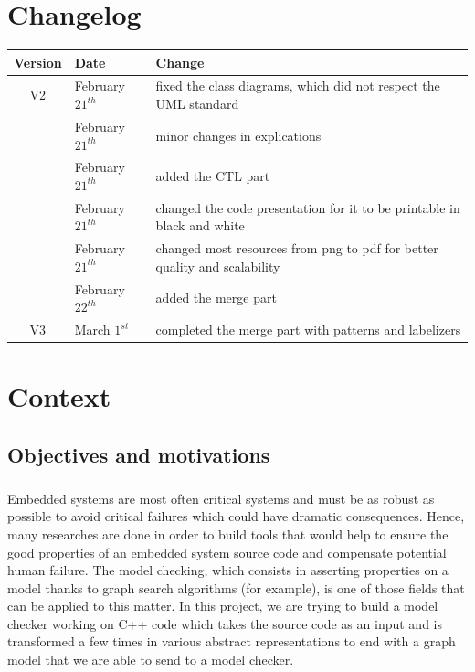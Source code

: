 \documentclass{report}
\begin{document}
\chapter*{Changelog}
\begin{center}
\begin{tabular}{|c|l|l|}
  \hline
  Version & Date & Change  \\
  \hline
  V2 & February $21^{th}$  & fixed the class diagrams, which did not respect the UML standard \\
  & February $21^{th}$ & minor changes in explications \\
  & February $21^{th}$ & added the CTL part \\
  & February $21^{th}$ & changed the code presentation for it to be printable in black and white \\
  & February $21^{th}$ & changed most resources from png to pdf for better quality and scalability \\
  & February $22^{th}$ & added the merge part \\
  \hline
  V3 & March $1^{st}$ & completed the merge part with patterns and labelizers \\
 \hline
\end{tabular}
\end{center}
\chapter{Context}

\section{Objectives and motivations}

\paragraph{}
\hspace{4mm}Embedded systems are most often critical systems and must be as robust as possible to avoid critical failures which could have dramatic consequences.
Hence, many researches are done in order to build tools that would help to ensure the good properties of an embedded system source code and compensate potential human
failure. The model checking, which consists in asserting properties on a model thanks to graph search algorithms (for example), is one of those fields that can be
applied to this matter. In this project, we are trying to build a model checker working on C++ code which takes the source code as an input and is transformed a few times
in various abstract representations to end with a graph model that we are able to send to a model checker.
\end{document}
